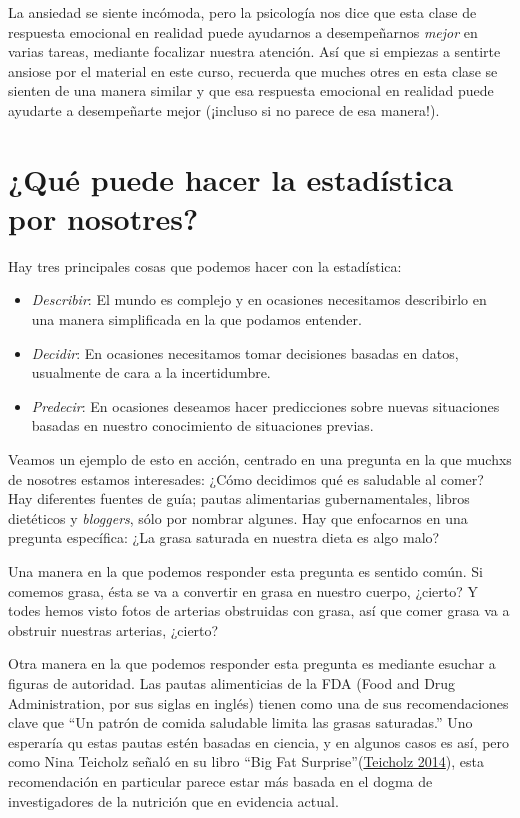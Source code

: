 \documentclass[
  12pt,
]{book}
\providecommand{\tightlist}{%
  \setlength{\itemsep}{0pt}\setlength{\parskip}{0pt}}
\theoremstyle{definition}
\theoremstyle{definition}
\theoremstyle{definition}
\theoremstyle{remark}
\begin{document}
La ansiedad se siente incómoda, pero la psicología nos dice que esta clase de respuesta emocional en realidad puede ayudarnos a desempeñarnos \emph{mejor} en varias tareas, mediante focalizar nuestra atención. Así que si empiezas a sentirte ansiose por el material en este curso, recuerda que muches otres en esta clase se sienten de una manera similar y que esa respuesta emocional en realidad puede ayudarte a desempeñarte mejor (¡incluso si no parece de esa manera!).

\hypertarget{quuxe9-puede-hacer-la-estaduxedstica-por-nosotres}{%
\section{¿Qué puede hacer la estadística por nosotres?}\label{quuxe9-puede-hacer-la-estaduxedstica-por-nosotres}}

Hay tres principales cosas que podemos hacer con la estadística:

\begin{itemize}
\tightlist
\item
  \emph{Describir}: El mundo es complejo y en ocasiones necesitamos describirlo en una manera simplificada en la que podamos entender.
\item
  \emph{Decidir}: En ocasiones necesitamos tomar decisiones basadas en datos, usualmente de cara a la incertidumbre.
\item
  \emph{Predecir}: En ocasiones deseamos hacer predicciones sobre nuevas situaciones basadas en nuestro conocimiento de situaciones previas.
\end{itemize}

Veamos un ejemplo de esto en acción, centrado en una pregunta en la que muchxs de nosotres estamos interesades: ¿Cómo decidimos qué es saludable al comer?
Hay diferentes fuentes de guía; pautas alimentarias gubernamentales, libros dietéticos y \emph{bloggers}, sólo por nombrar algunes.
Hay que enfocarnos en una pregunta específica: ¿La grasa saturada en nuestra dieta es algo malo?

Una manera en la que podemos responder esta pregunta es sentido común.
Si comemos grasa, ésta se va a convertir en grasa en nuestro cuerpo, ¿cierto?
Y todes hemos visto fotos de arterias obstruidas con grasa, así que comer grasa va a obstruir nuestras arterias, ¿cierto?

Otra manera en la que podemos responder esta pregunta es mediante esuchar a figuras de autoridad. Las pautas alimenticias de la FDA (Food and Drug Administration, por sus siglas en inglés) tienen como una de sus recomendaciones clave que ``Un patrón de comida saludable limita las grasas saturadas.'' Uno esperaría qu estas pautas estén basadas en ciencia, y en algunos casos es así, pero como Nina Teicholz señaló en su libro ``Big Fat Surprise''(\protect\hyperlink{ref-teic:2014}{Teicholz 2014}), esta recomendación en particular parece estar más basada en el dogma de investigadores de la nutrición que en evidencia actual.
\end{document}
